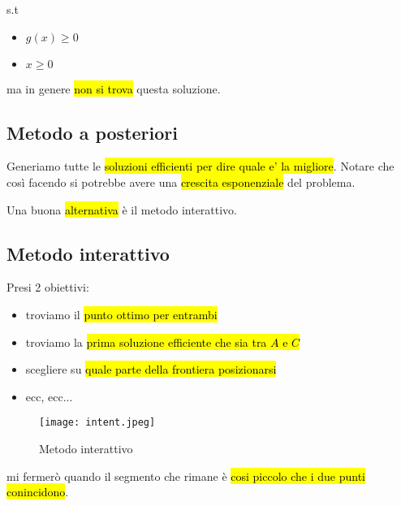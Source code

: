 s.t
\begin{itemize}
    \item $g(x) \geq 0$
    \item $x \geq 0$
\end{itemize}

ma in genere \hl{non si trova} questa soluzione.


\subsection{Metodo a posteriori}

Generiamo tutte le \hl{soluzioni efficienti per dire quale e' la migliore}. Notare che così facendo si potrebbe avere una \hl{crescita esponenziale} del problema.

Una buona \hl{alternativa} è il metodo interattivo.


\subsection{Metodo interattivo}

Presi 2 obiettivi:

\begin{itemize}
    \item troviamo il \hl{punto ottimo per entrambi}
    \item troviamo la \hl{prima soluzione efficiente che sia tra $A$ e $C$}
    \item scegliere su \hl{quale parte della frontiera posizionarsi}
    \item ecc, ecc...
\end{itemize}

\begin{figure}[H]
\centering
\texttt{[image: intent.jpeg]}
\caption{Metodo interattivo} 
\label{intent}
\end{figure}

mi fermerò quando il segmento che rimane è \hl{cosi piccolo che i due punti conincidono}.
